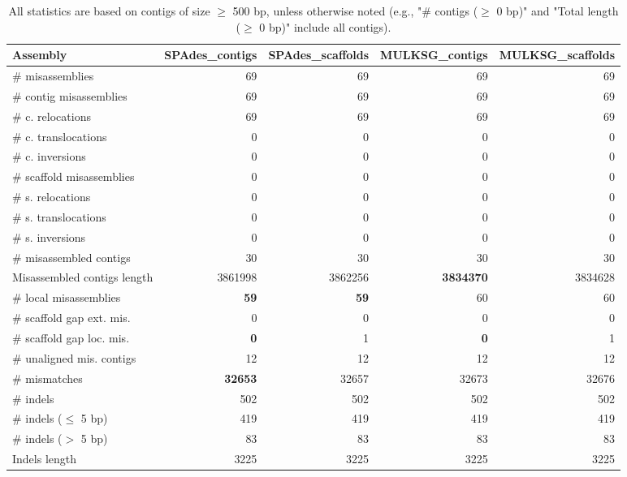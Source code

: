 \documentclass[12pt,a4paper]{article}
\begin{document}
\begin{table}[ht]
\begin{center}
\caption{All statistics are based on contigs of size $\geq$ 500 bp, unless otherwise noted (e.g., "\# contigs ($\geq$ 0 bp)" and "Total length ($\geq$ 0 bp)" include all contigs).}
\begin{tabular}{|l*{4}{|r}|}
\hline
Assembly & SPAdes\_contigs & SPAdes\_scaffolds & MULKSG\_contigs & MULKSG\_scaffolds \\ \hline
\# misassemblies & 69 & 69 & 69 & 69 \\ \hline
\hspace{2mm}\# contig misassemblies & 69 & 69 & 69 & 69 \\ \hline
\hspace{5mm}\# c. relocations & 69 & 69 & 69 & 69 \\ \hline
\hspace{5mm}\# c. translocations & 0 & 0 & 0 & 0 \\ \hline
\hspace{5mm}\# c. inversions & 0 & 0 & 0 & 0 \\ \hline
\hspace{2mm}\# scaffold misassemblies & 0 & 0 & 0 & 0 \\ \hline
\hspace{5mm}\# s. relocations & 0 & 0 & 0 & 0 \\ \hline
\hspace{5mm}\# s. translocations & 0 & 0 & 0 & 0 \\ \hline
\hspace{5mm}\# s. inversions & 0 & 0 & 0 & 0 \\ \hline
\# misassembled contigs & 30 & 30 & 30 & 30 \\ \hline
Misassembled contigs length & 3861998 & 3862256 & {\bf 3834370} & 3834628 \\ \hline
\# local misassemblies & {\bf 59} & {\bf 59} & 60 & 60 \\ \hline
\# scaffold gap ext. mis. & 0 & 0 & 0 & 0 \\ \hline
\# scaffold gap loc. mis. & {\bf 0} & 1 & {\bf 0} & 1 \\ \hline
\# unaligned mis. contigs & 12 & 12 & 12 & 12 \\ \hline
\# mismatches & {\bf 32653} & 32657 & 32673 & 32676 \\ \hline
\# indels & 502 & 502 & 502 & 502 \\ \hline
\hspace{5mm}\# indels ($\leq$ 5 bp) & 419 & 419 & 419 & 419 \\ \hline
\hspace{5mm}\# indels ($>$ 5 bp) & 83 & 83 & 83 & 83 \\ \hline
Indels length & 3225 & 3225 & 3225 & 3225 \\ \hline
\end{tabular}
\end{center}
\end{table}
\end{document}
